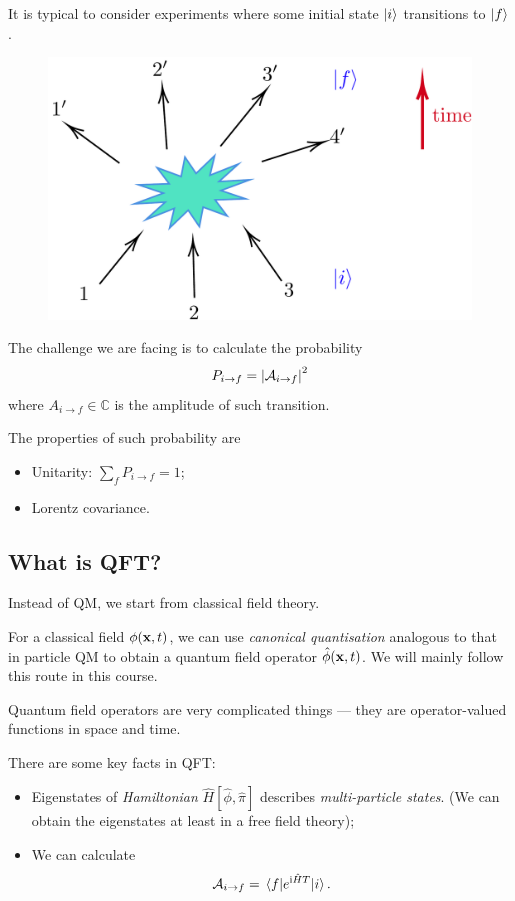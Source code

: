 \documentclass[a4paper,11pt]{article}
\begin{document}
	It is typical to consider experiments where some initial state $\ket{i}$ transitions to $\ket{f}$.
	
	\begin{figure}[H]
		\centering
		\includegraphics[width=0.5\linewidth]{fig/fig1.pdf}
	\end{figure}

	The challenge we are facing is to calculate the probability 
	\[
		P_{i \to f} = \abs{\mathcal{A}_{i \to f}}^2
	\]
	where $A_{i \to f} \in \mathbb{C}$ is the amplitude of such transition.

	The properties of such probability are
	\begin{itemize}
		\item Unitarity: $\sum_f P_{i \to f} = 1$;
		\item Lorentz covariance.
	\end{itemize}

	\subsection*{What is QFT?}
	Instead of QM, we start from classical field theory.

	For a classical field $\phi(\vb x, t)$, we can use \emph{canonical quantisation} analogous to that in particle QM to obtain a quantum field operator $\hat{\phi}(\vb x,t)$. We will mainly follow this route in this course.

	Quantum field operators are very complicated things --- they are operator-valued functions in space and time.

	There are some key facts in QFT:
	\begin{itemize}
		\item Eigenstates of \emph{Hamiltonian} $\hat{H}[\hat{\phi}, \hat{\pi}]$ describes \emph{multi-particle states}. (We can obtain the eigenstates at least in a free field theory);
		\item We can calculate \[
			\mathcal{A}_{i \to f} = \mel{f}{e^{\mathrm{i} \hat{H} T}}{i}.
		\]
	\end{itemize}
\end{document}
